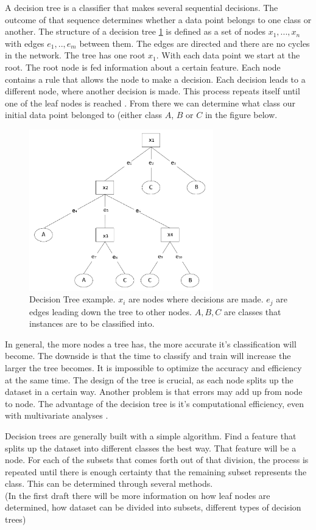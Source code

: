 A decision tree is a classifier that makes several sequential decisions. The outcome of that sequence determines whether a data point belongs to one class or another. The structure of a decision tree \ref{fig:DT} is defined as a set of nodes ${x_1, ... , x_n}$ with edges ${e_1, .., e_{m}}$ between them. The edges are directed and there are no cycles in the network. The tree has one root $x_1$. With each data point we start at the root. The root node is fed information about a certain feature. Each node contains a rule that allows the node to make a decision. Each decision leads to a different node, where another decision is made. This process repeats itself until one of the leaf nodes is reached \cite{safavian1991survey}. From there we can determine what class our initial data point belonged to (either class $A$, $B$ or $C$ in the figure below. 
\begin{figure}[H]
    \includegraphics[width=80mm]{./img/decisiontree.png}
    \caption{Decision Tree example. $x_i$ are nodes where decisions are made. $e_j$ are edges leading down the tree to other nodes. $A,B,C$ are classes that instances are to be classified into.}
    \label{fig:DT}
\end{figure}

In general, the more nodes a tree has, the more accurate it's classification will become. The downside is that the time to classify and train will increase the larger the tree becomes. It is impossible to optimize the accuracy and efficiency at the same time. The design of the tree is crucial, as each node splits up the dataset in a certain way. Another problem is that errors may add up from node to node. The advantage of the decision tree is it's computational efficiency, even with multivariate analyses \cite{safavian1991survey}.


Decision trees are generally built with a simple algorithm. Find a feature that splits up the dataset into different classes the best way. That feature will be a node. For each of the subsets that comes forth out of that division, the process is repeated until there is enough certainty that the remaining subset represents the class. This can be determined through several methods. \\

(In the first draft there will be more information on how leaf nodes are determined, how dataset can be divided into subsets, different types of decision trees)